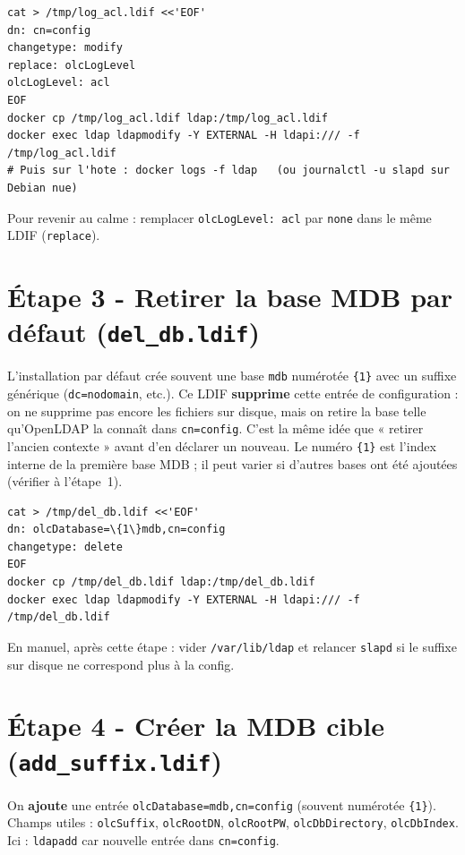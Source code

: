\documentclass[11pt,a4paper]{report}
\begin{document}
\begin{lstlisting}[style=bashstyle]
cat > /tmp/log_acl.ldif <<'EOF'
dn: cn=config
changetype: modify
replace: olcLogLevel
olcLogLevel: acl
EOF
docker cp /tmp/log_acl.ldif ldap:/tmp/log_acl.ldif
docker exec ldap ldapmodify -Y EXTERNAL -H ldapi:/// -f /tmp/log_acl.ldif
# Puis sur l'hote : docker logs -f ldap   (ou journalctl -u slapd sur Debian nue)
\end{lstlisting}

Pour revenir au calme : remplacer \texttt{olcLogLevel: acl} par \texttt{none} dans le même LDIF (\texttt{replace}).

\section{Étape 3 - Retirer la base MDB par défaut (\texttt{del\_db.ldif})}

L'installation par défaut crée souvent une base \texttt{mdb} numérotée \texttt{\{1\}} avec un suffixe générique (\texttt{dc=nodomain}, etc.). Ce LDIF \textbf{supprime} cette entrée de configuration : on ne supprime pas encore les fichiers sur disque, mais on retire la base telle qu'OpenLDAP la connaît dans \texttt{cn=config}. C'est la même idée que « retirer l'ancien contexte » avant d'en déclarer un nouveau. Le numéro \texttt{\{1\}} est l'index interne de la première base MDB ; il peut varier si d'autres bases ont été ajoutées (vérifier à l'étape~1).

\begin{lstlisting}[style=bashstyle]
cat > /tmp/del_db.ldif <<'EOF'
dn: olcDatabase=\{1\}mdb,cn=config
changetype: delete
EOF
docker cp /tmp/del_db.ldif ldap:/tmp/del_db.ldif
docker exec ldap ldapmodify -Y EXTERNAL -H ldapi:/// -f /tmp/del_db.ldif
\end{lstlisting}

En manuel, après cette étape : vider \texttt{/var/lib/ldap} et relancer \texttt{slapd} si le suffixe sur disque ne correspond plus à la config.

\section{Étape 4 - Créer la MDB cible (\texttt{add\_suffix.ldif})}

On \textbf{ajoute} une entrée \texttt{olcDatabase=mdb,cn=config} (souvent numérotée \texttt{\{1\}}). Champs utiles : \texttt{olcSuffix}, \texttt{olcRootDN}, \texttt{olcRootPW}, \texttt{olcDbDirectory}, \texttt{olcDbIndex}. Ici : \texttt{ldapadd} car nouvelle entrée dans \texttt{cn=config}.
\end{document}
